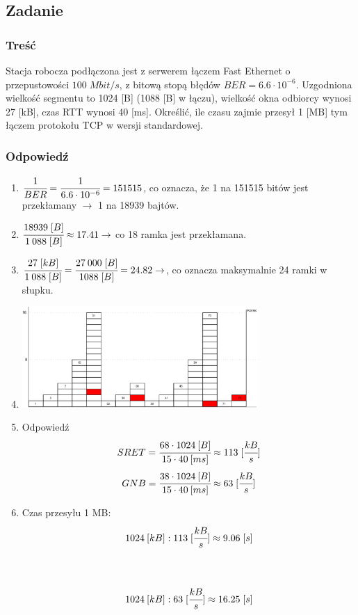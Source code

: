 	\subsection{Zadanie}
		\subsubsection{Treść}
			Stacja robocza podłączona jest z serwerem łączem Fast Ethernet o przepustowości $100\;Mbit/s $, z bitową stopą błędów $ BER=6.6\cdot 10^{-6} $. Uzgodniona wielkość segmentu to 1024 [B] (1088 [B] w łączu), wielkość okna odbiorcy wynosi 27 [kB], czas RTT wynosi 40 [ms]. Określić, ile czasu zajmie przesył 1 [MB] tym łączem protokołu TCP w wersji standardowej.
		\subsubsection{Odpowiedź}
		\begin{enumerate}
			\item $ \cfrac{1}{BER}=\cfrac{1}{6.6\cdot 10^{-6}}=151515$, co oznacza, że 1 na 151515 bitów jest przekłamany $ \rightarrow $ 1 na 18939 bajtów.
			\item $ \cfrac{18939\;[B]}{1\:088\;[B]}\approx17.41 \rightarrow $ co 18 ramka jest przekłamana.
			\item $ \cfrac{27\;[kB]}{1\:088\;[B]}=\cfrac{27\:000\;[B]}{1088\;[B]}=24.82 \rightarrow $, co oznacza maksymalnie 24 ramki w słupku.
			\item
				\begin{center}
					\includegraphics[width=9.0cm]{./images/zadanie14.pdf}
				\end{center}
			\item Odpowiedź
			$$ SRET=\cfrac{68\cdot1024\:[B]}{15\cdot40\:[ms]}\approx113\;[\cfrac{kB}{s}]$$
			$$\\\\ GNB=\cfrac{38\cdot1024\:[B]}{15\cdot40\:[ms]}\approx63\;[\cfrac{kB}{s}]$$
			\item Czas przesyłu 1 MB:\\
			$$ 1024\:[kB] : 113\;[\cfrac{kB}{s}]\approx9.06\;[s] $$\\\\
			$$ 1024\:[kB] : 63\;[\cfrac{kB}{s}]\approx16.25\;[s] $$
		\end{enumerate}
\newpage
